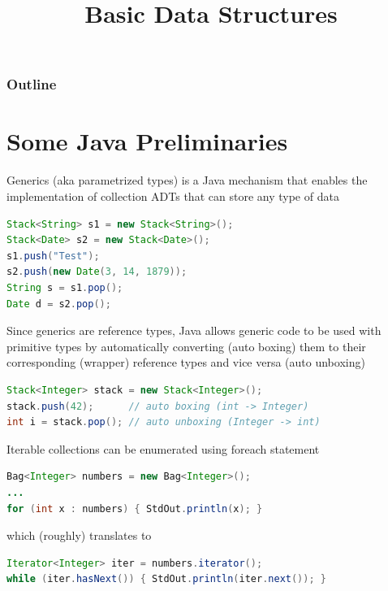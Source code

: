 \documentclass[8pt,a4paper,compress]{beamer}
\title{Basic Data Structures}
\date{}
\begin{document}
\begin{frame}
\vfill
\titlepage
\end{frame}

\begin{frame}
\frametitle{Outline}
\tableofcontents
\end{frame}

\section{Some Java Preliminaries}
\begin{frame}[fragile]
\pause

Generics (aka parametrized types) is a Java mechanism that enables the implementation of collection ADTs that can store any type of data

\begin{lstlisting}[language=Java]
Stack<String> s1 = new Stack<String>();
Stack<Date> s2 = new Stack<Date>();
s1.push("Test");
s2.push(new Date(3, 14, 1879));
String s = s1.pop();
Date d = s2.pop();
\end{lstlisting}

\pause
\bigskip

Since generics are reference types, Java allows generic code to be used with primitive types by automatically converting (auto boxing) them to their corresponding (wrapper) reference types and vice versa (auto unboxing)
\begin{lstlisting}[language=Java]
Stack<Integer> stack = new Stack<Integer>();
stack.push(42);      // auto boxing (int -> Integer)
int i = stack.pop(); // auto unboxing (Integer -> int)
\end{lstlisting}

\pause
\bigskip

Iterable collections can be enumerated using foreach statement 
\begin{lstlisting}[language=Java]
Bag<Integer> numbers = new Bag<Integer>();
...
for (int x : numbers) { StdOut.println(x); }
\end{lstlisting}

which (roughly) translates to 

\begin{lstlisting}[language=Java]
Iterator<Integer> iter = numbers.iterator();
while (iter.hasNext()) { StdOut.println(iter.next()); }
\end{lstlisting}
\end{frame}
\end{document}
